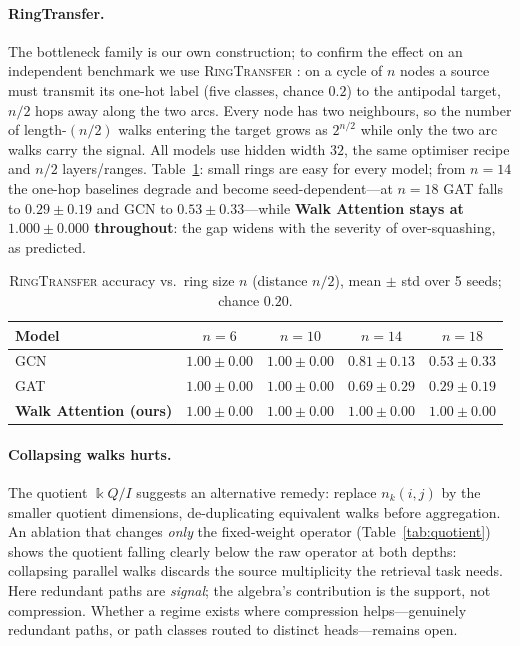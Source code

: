 \documentclass[runningheads]{llncs}
\newcommand{\kk}{\Bbbk}
\newcommand{\kQ}{\kk Q}
\begin{document}
\paragraph{RingTransfer.}
The bottleneck family is our own construction; to confirm the effect on an
independent benchmark we use \textsc{RingTransfer}
\cite{bodnar2021cw,digiovanni2023oversquashing}: on a cycle of $n$ nodes a
source must transmit its one-hot label (five classes, chance $0.2$) to the
antipodal target, $n/2$ hops away along the two arcs. Every node has two
neighbours, so the number of length-$(n/2)$ walks entering the target grows as
$2^{n/2}$ while only the two arc walks carry the signal. All models use hidden
width $32$, the same optimiser recipe and $n/2$ layers/ranges.
Table~\ref{tab:ring}: small rings are easy for every model; from $n{=}14$ the
one-hop baselines degrade and become seed-dependent---at $n{=}18$ GAT falls to
$0.29\pm0.19$ and GCN to $0.53\pm0.33$---while \textbf{Walk Attention stays at
$1.000\pm0.000$ throughout}: the gap widens with the severity of
over-squashing, as predicted.

\begin{table}[t]
\centering
\caption{\textsc{RingTransfer} accuracy vs.\ ring size $n$ (distance $n/2$),
mean $\pm$ std over 5 seeds; chance $0.20$.}
\label{tab:ring}
\begin{tabular}{lcccc}
\toprule
\textbf{Model} & $n{=}6$ & $n{=}10$ & $n{=}14$ & $n{=}18$ \\
\midrule
GCN                    & $1.00\pm0.00$ & $1.00\pm0.00$ & $0.81\pm0.13$ & $0.53\pm0.33$ \\
GAT                    & $1.00\pm0.00$ & $1.00\pm0.00$ & $0.69\pm0.29$ & $0.29\pm0.19$ \\
\textbf{Walk Attention (ours)} & $\mathbf{1.00\pm0.00}$ & $\mathbf{1.00\pm0.00}$ & $\mathbf{1.00\pm0.00}$ & $\mathbf{1.00\pm0.00}$ \\
\bottomrule
\end{tabular}
\end{table}

\paragraph{Collapsing walks hurts.}
The quotient $\kQ/I$ suggests an alternative remedy: replace $n_k(i,j)$ by the
smaller quotient dimensions, de-duplicating equivalent walks before
aggregation. An ablation that changes \emph{only} the fixed-weight operator
(Table~\ref{tab:quotient}) shows the quotient falling clearly below the raw
operator at both depths: collapsing parallel walks discards the source
multiplicity the retrieval task needs. Here redundant paths are \emph{signal};
the algebra's contribution is the support, not compression. Whether a regime
exists where compression helps---genuinely redundant paths, or path classes
routed to distinct heads---remains open.
\end{document}

